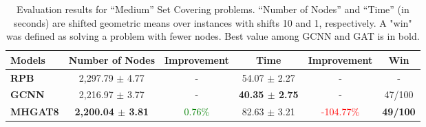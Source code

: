 \begin{table*}[htb!]
    \centering
    \begin{tabular}{|l c c c c c|}
        \hline
        \textbf{Models} & \textbf{Number of Nodes} & \textbf{Improvement} & \textbf{Time} & \textbf{Improvement} & \textbf{Win}\\
        \hline
        \textbf{RPB} & 2,297.79 $\pm$ 4.77 & - & 54.07 $\pm$ 2.27 & - & -\\
        \hline
        \textbf{GCNN} & 2,216.97 $\pm$ 3.77 & - & \textbf{40.35 $\pm$ 2.75} & - & 47/100\\
        \textbf{MHGAT8} & \textbf{2,200.04 $\pm$ 3.81} & \textcolor{green}{0.76\%} & 82.63 $\pm$ 3.21 & \textcolor{red}{-104.77\%} & \textbf{49/100}\\
        \hline
    \end{tabular}
    \caption{Evaluation results for “Medium” Set Covering problems. “Number of Nodes” and “Time” (in seconds) are shifted geometric means over instances with shifts 10 and 1, respectively.
    A "win" was defined as solving a problem with fewer nodes.
    Best value among GCNN and GAT is in bold.}
    \label{tab:sc-results-medium}
\end{table*}